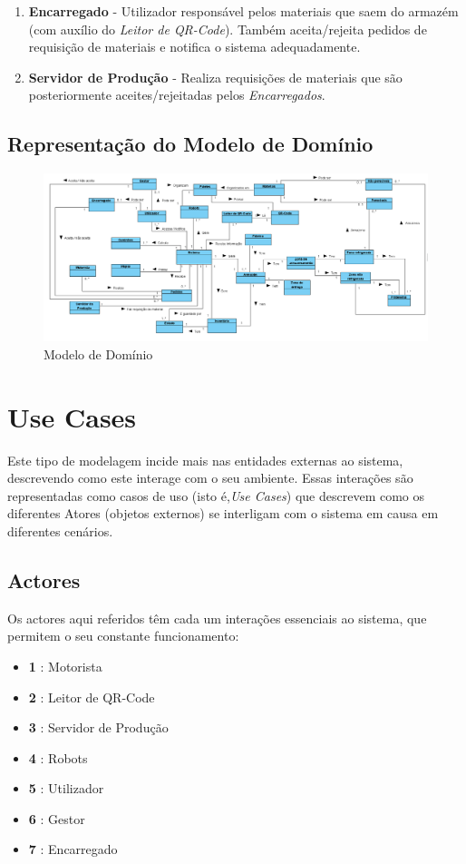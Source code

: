 \documentclass[a4paper]{report}
\begin{document}
\begin{enumerate}
    \item \textbf{Encarregado} - Utilizador responsável pelos materiais que saem do armazém (com auxílio do \textit{Leitor de QR-Code}). Também aceita/rejeita pedidos de requisição de materiais e notifica o sistema adequadamente. \newline
    \item \textbf{Servidor de Produção}  - Realiza requisições de materiais que são posteriormente aceites/rejeitadas pelos \textit{Encarregados}.
\end{enumerate}

\section{Representação do Modelo de Domínio}

\begin{figure}[H]
\begin{center}
\includegraphics[scale=0.40]{images/MD.png}
\caption{\label{fig:MD} Modelo de Domínio }
\end{center}
\end{figure}

\chapter{Use Cases}

Este tipo de modelagem incide mais nas entidades externas ao sistema, descrevendo como este interage com o seu ambiente. Essas interações são representadas como casos de uso (isto é,\textit{Use Cases}) que descrevem como os diferentes Atores (objetos externos) se interligam com o sistema em causa em diferentes cenários.

\section{Actores}
Os actores aqui referidos têm cada um interações essenciais ao sistema, que permitem o seu constante funcionamento:
\begin{itemize}
    \item \textbf{1} : Motorista
    \item \textbf{2} : Leitor de QR-Code
    \item \textbf{3} : Servidor de Produção
    \item \textbf{4} : Robots
    \item \textbf{5} : Utilizador
    \item \textbf{6} : Gestor
    \item \textbf{7} : Encarregado
\end{itemize}
\end{document}
